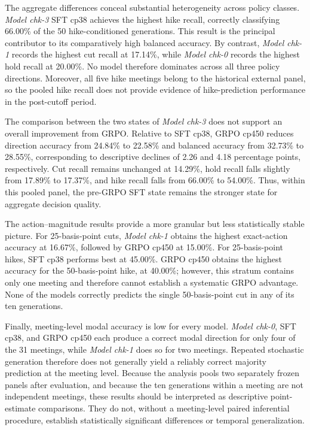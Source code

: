 The aggregate differences conceal substantial heterogeneity across policy classes. \textit{Model chk-3} SFT cp38 achieves the highest hike recall, correctly classifying 66.00\% of the 50 hike-conditioned generations. This result is the principal contributor to its comparatively high balanced accuracy. By contrast, \textit{Model chk-1} records the highest cut recall at 17.14\%, while \textit{Model chk-0} records the highest hold recall at 20.00\%. No model therefore dominates across all three policy directions. Moreover, all five hike meetings belong to the historical external panel, so the pooled hike recall does not provide evidence of hike-prediction performance in the post-cutoff period.

The comparison between the two states of \textit{Model chk-3} does not support an overall improvement from GRPO. Relative to SFT cp38, GRPO cp450 reduces direction accuracy from 24.84\% to 22.58\% and balanced accuracy from 32.73\% to 28.55\%, corresponding to descriptive declines of 2.26 and 4.18 percentage points, respectively. Cut recall remains unchanged at 14.29\%, hold recall falls slightly from 17.89\% to 17.37\%, and hike recall falls from 66.00\% to 54.00\%. Thus, within this pooled panel, the pre-GRPO SFT state remains the stronger state for aggregate decision quality.

The action--magnitude results provide a more granular but less statistically stable picture. For 25-basis-point cuts, \textit{Model chk-1} obtains the highest exact-action accuracy at 16.67\%, followed by GRPO cp450 at 15.00\%. For 25-basis-point hikes, SFT cp38 performs best at 45.00\%. GRPO cp450 obtains the highest accuracy for the 50-basis-point hike, at 40.00\%; however, this stratum contains only one meeting and therefore cannot establish a systematic GRPO advantage. None of the models correctly predicts the single 50-basis-point cut in any of its ten generations.

Finally, meeting-level modal accuracy is low for every model. \textit{Model chk-0}, SFT cp38, and GRPO cp450 each produce a correct modal direction for only four of the 31 meetings, while \textit{Model chk-1} does so for two meetings. Repeated stochastic generation therefore does not generally yield a reliably correct majority prediction at the meeting level. Because the analysis pools two separately frozen panels after evaluation, and because the ten generations within a meeting are not independent meetings, these results should be interpreted as descriptive point-estimate comparisons. They do not, without a meeting-level paired inferential procedure, establish statistically significant differences or temporal generalization.



